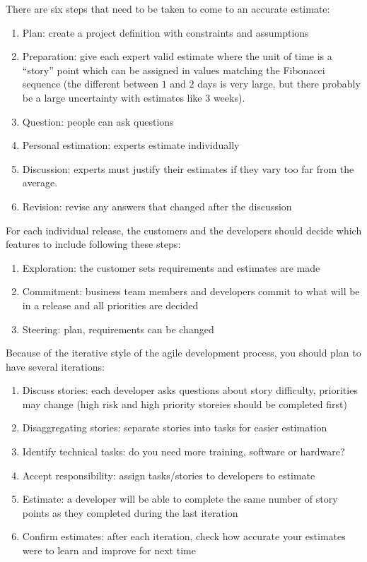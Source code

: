 There are six steps that need to be taken to come to an accurate estimate:
\begin{enumerate}
	\item Plan: create a project definition with constraints and assumptions
	\item Preparation: give each expert valid estimate where the unit of time is a ``story'' point which can be assigned in values matching the Fibonacci sequence (the different between \(1\) and \(2\) days is very large, but there probably be a large uncertainty with estimates like \(3\) weeks).
	\item Question: people can ask questions
	\item Personal estimation: experts estimate individually
	\item Discussion: experts must justify their estimates if they vary too far from the average.
	\item Revision: revise any answers that changed after the discussion
\end{enumerate}
For each individual release, the customers and the developers should decide which features to include following these steps:
\begin{enumerate}
	\item Exploration: the customer sets requirements and estimates are made
	\item Commitment: business team members and developers commit to what will be in a release and all priorities are decided
	\item Steering: plan, requirements can be changed
\end{enumerate}
Because of the iterative style of the agile development process, you should plan to have several iterations:
\begin{enumerate}
	\item Discuss stories: each developer asks questions about story difficulty, priorities may change (high risk and high priority storeies should be completed first)
	\item Disaggregating stories: separate stories into tasks for easier estimation
	\item Identify technical tasks: do you need more training, software or hardware?
	\item Accept responsibility: assign tasks/stories to developers to estimate
	\item Estimate: a developer will be able to complete the same number of story points as they completed during the last iteration
	\item Confirm estimates: after each iteration, check how accurate your estimates were to learn and improve for next time
\end{enumerate}

